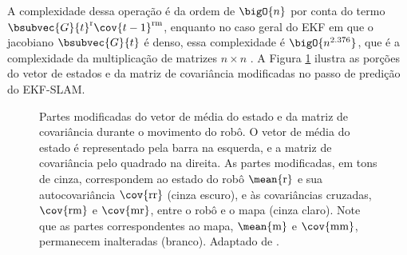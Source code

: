 \renewcommand{\arraystretch}{1.0}
A complexidade dessa operação é da ordem de $\bigO{n}$ por conta do termo $\bsubvec{G}{t}^\mathrm{r} \cov{t-1}^\mathrm{rm}$, enquanto no caso geral do EKF em que o jacobiano $\bsubvec{G}{t}$ é denso, essa complexidade é $\bigO{n^{2.376}}$, que é a complexidade da multiplicação de matrizes $n \times n$ \cite{coppersmith1987matrix}. A Figura 
\ref{fig:ekfslam-prediction} ilustra as porções do vetor de estados e da 
matriz de covariância modificadas no passo de predição do EKF-SLAM.

\begin{figure}[h]
  \centering
  
  \caption[Elementos do vetor média e da matriz de covariância alterados no passo de predição do Filtro de Kalman Estendido de um sistema SLAM]{Partes modificadas do vetor de média do estado e da matriz de covariância durante o movimento do robô. O vetor de média do estado é representado pela barra na esquerda, e a matriz de covariância pelo quadrado na direita. As partes modificadas, em tons de cinza, correspondem ao estado do robô $\mean{\mathrm{r}}$  e sua autocovariância $\cov{\mathrm{rr}}$ (cinza escuro), e às covariâncias cruzadas, $\cov{\mathrm{rm}}$ e $\cov{\mathrm{mr}}$, entre o robô e o mapa (cinza claro). Note que as partes correspondentes ao mapa, $\mean{\mathrm{m}}$ e $\cov{\mathrm{mm}}$, 
  permanecem inalteradas (branco). Adaptado de .}
  \label{fig:ekfslam-prediction}
\end{figure}


